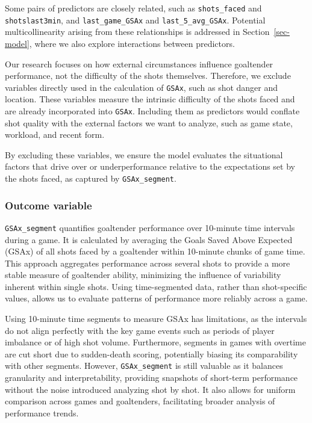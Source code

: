 \documentclass[
  letterpaper,
  DIV=11,
  numbers=noendperiod]{scrartcl}
\begin{document}
Some pairs of predictors are closely related, such as
\texttt{shots\_faced} and \texttt{shotslast3min}, and
\texttt{last\_game\_GSAx} and \texttt{last\_5\_avg\_GSAx}. Potential
multicollinearity arising from these relationships is addressed in
Section~\ref{sec-model}, where we also explore interactions between
predictors.

Our research focuses on how external circumstances influence goaltender
performance, not the difficulty of the shots themselves. Therefore, we
exclude variables directly used in the calculation of \texttt{GSAx},
such as shot danger and location. These variables measure the intrinsic
difficulty of the shots faced and are already incorporated into
\texttt{GSAx}. Including them as predictors would conflate shot quality
with the external factors we want to analyze, such as game state,
workload, and recent form.

By excluding these variables, we ensure the model evaluates the
situational factors that drive over or underperformance relative to the
expectations set by the shots faced, as captured by
\texttt{GSAx\_segment}.

\subsubsection{Outcome variable}\label{sec-responsevariable}

\texttt{GSAx\_segment} quantifies goaltender performance over 10-minute
time intervals during a game. It is calculated by averaging the Goals
Saved Above Expected (GSAx) of all shots faced by a goaltender within
10-minute chunks of game time. This approach aggregates performance
across several shots to provide a more stable measure of goaltender
ability, minimizing the influence of variability inherent within single
shots. Using time-segmented data, rather than shot-specific values,
allows us to evaluate patterns of performance more reliably across a
game.

Using 10-minute time segments to measure GSAx has limitations, as the
intervals do not align perfectly with the key game events such as
periods of player imbalance or of high shot volume. Furthermore,
segments in games with overtime are cut short due to sudden-death
scoring, potentially biasing its comparability with other segments.
However, \texttt{GSAx\_segment} is still valuable as it balances
granularity and interpretability, providing snapshots of short-term
performance without the noise introduced analyzing shot by shot. It also
allows for uniform comparison across games and goaltenders, facilitating
broader analysis of performance trends.
\end{document}
